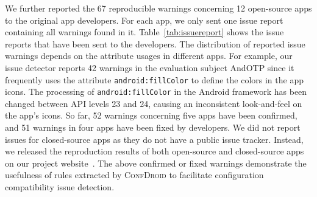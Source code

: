 We further reported the 67 reproducible warnings concerning 12 open-source apps
to the original app developers.
For each app, we only sent one issue report containing all warnings found in it.
Table~\ref{tab:issuereport} shows the issue reports that have been sent to the developers.
The distribution of reported issue warnings depends on the attribute usages in different apps. For example, our issue detector reports 42 warnings in the evaluation subject AndOTP since it frequently uses the attribute \texttt{android:fillColor} to define the colors in the app icons. The processing of \texttt{android:fillColor} in the Android framework has been changed between API levels 23 and 24, causing an inconsistent look-and-feel on the app's icons.
So far, 52 warnings concerning five apps have been confirmed, and 51 warnings in four apps have been fixed by developers.
We did not report issues for closed-source apps as they do not have a public issue tracker.
Instead, we released the reproduction results of both open-source and closed-source apps on our project website~\cite{confdroid}.
The above confirmed or fixed warnings demonstrate the usefulness of rules extracted by \textsc{ConfDroid} to facilitate configuration compatibility issue detection.
